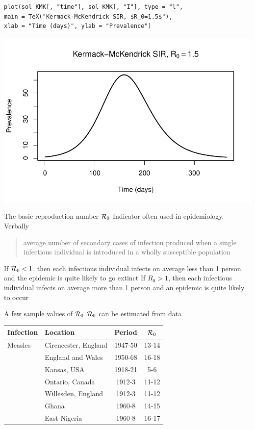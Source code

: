 \documentclass[aspectratio=169]{beamer}\usepackage[]{graphicx}\usepackage[]{xcolor}
\begin{document}
\begin{frame}[fragile]{}
\begin{lstlisting}
plot(sol_KMK[, "time"], sol_KMK[, "I"], type = "l",
main = TeX("Kermack-McKendrick SIR, $R_0=1.5$"),
xlab = "Time (days)", ylab = "Prevalence")
\end{lstlisting}
\begin{center}
\includegraphics[width=\textwidth]{FIGS/course-01-KMK_R0eq1dot5-1.pdf}
\end{center}
\end{frame}


\begin{frame}{The basic reproduction number $\mathcal{R}_0$}
\bbullet Indicator often used in epidemiology. Verbally
\begin{quote}
  average number of secondary cases of infection produced when a single infectious individual is introduced in a wholly susceptible population
\end{quote}
\vfill
\bbullet If $\mathcal{R}_0<1$, then each infectious individual infects on average less than 1 person and the epidemic is quite likely to go extinct 
\vfill
\bbullet If $R_0>1$, then each infectious individual infects on average more than 1 person and an epidemic is quite likely to occur
\end{frame}

\begin{frame}{A few sample values of $\mathcal{R}_0$}
  $\mathcal{R}_0$ can be estimated from data
  \vfill
  \begin{center}
  \begin{tabular}{llcc}
  \hline 
  Infection & Location & Period & $\mathcal{R}_0$ \\
  \hline
  Measles & Cirencester, England & 1947-50 & 13-14 \\
  & England and Wales & 1950-68 & 16-18 \\
  & Kansas, USA & 1918-21 & 5-6 \\
  & Ontario, Canada & 1912-3 & 11-12 \\
  & Willesden, England & 1912-3 & 11-12 \\
  & Ghana & 1960-8 & 14-15 \\
  & East Nigeria & 1960-8 & 16-17 \\
  \end{tabular}
  \end{center}
\end{frame}
    
\end{document}
